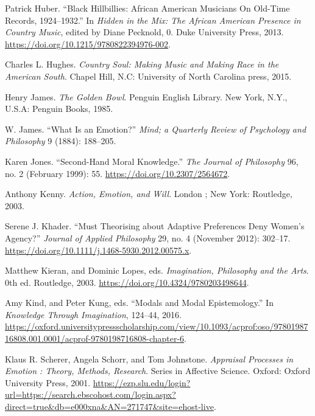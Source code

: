 \documentclass[phdthesis,12pt,final,a4paper]{wuthesis}
\newlength{\cslhangindent}
\newenvironment{CSLReferences}[2] %
{\begin{list}{}{%
	\setlength{\itemindent}{0pt}
	\setlength{\leftmargin}{0pt}
	\setlength{\parsep}{0pt}
	\ifodd #1
	\setlength{\leftmargin}{\cslhangindent}
	\setlength{\itemindent}{-1\cslhangindent}
	\fi
	\setlength{\itemsep}{#2\baselineskip}}}
{\end{list}}
\theoremstyle{definition}
\theoremstyle{definition}
\theoremstyle{definition}
\theoremstyle{definition}
\theoremstyle{remark}
\begin{document}
\begin{CSLReferences}{1}{0}
Patrick Huber. {``Black {Hillbillies}: {African American Musicians On Old-Time Records}, 1924--1932.''} In \emph{Hidden in the {Mix}: {The African American Presence} in {Country Music}}, edited by Diane Pecknold, 0. Duke University Press, 2013. \url{https://doi.org/10.1215/9780822394976-002}.

Charles L. Hughes. \emph{Country Soul: Making Music and Making Race in the {American South}}. Chapel Hill, N.C: University of North Carolina press, 2015.

Henry James. \emph{The Golden Bowl}. Penguin {English} Library. New York, N.Y., U.S.A: Penguin Books, 1985.

W. James. {``What Is an Emotion?''} \emph{Mind; a Quarterly Review of Psychology and Philosophy} 9 (1884): 188--205.

Karen Jones. {``Second-{Hand Moral Knowledge}.''} \emph{The Journal of Philosophy} 96, no. 2 (February 1999): 55. \url{https://doi.org/10.2307/2564672}.

Anthony Kenny. \emph{Action, Emotion, and Will}. London ; New York: Routledge, 2003.

Serene J. Khader. {``Must {Theorising} about {Adaptive Preferences Deny Women}'s {Agency}?''} \emph{Journal of Applied Philosophy} 29, no. 4 (November 2012): 302--17. \url{https://doi.org/10.1111/j.1468-5930.2012.00575.x}.

Matthew Kieran, and Dominic Lopes, eds. \emph{Imagination, {Philosophy} and the {Arts}}. 0th ed. Routledge, 2003. \url{https://doi.org/10.4324/9780203498644}.

Amy Kind, and Peter Kung, eds. {``Modals and {Modal Epistemology}.''} In \emph{Knowledge {Through Imagination}}, 124--44, 2016. \url{https://oxford.universitypressscholarship.com/view/10.1093/acprof:oso/9780198716808.001.0001/acprof-9780198716808-chapter-6}.

Klaus R. Scherer, Angela Schorr, and Tom Johnstone. \emph{Appraisal {Processes} in {Emotion} : {Theory}, {Methods}, {Research}}. Series in {Affective Science}. Oxford: Oxford University Press, 2001. \url{https://ezp.slu.edu/login?url=https://search.ebscohost.com/login.aspx?direct=true&db=e000xna&AN=271747&site=ehost-live}.


\end{CSLReferences}
\end{document}
